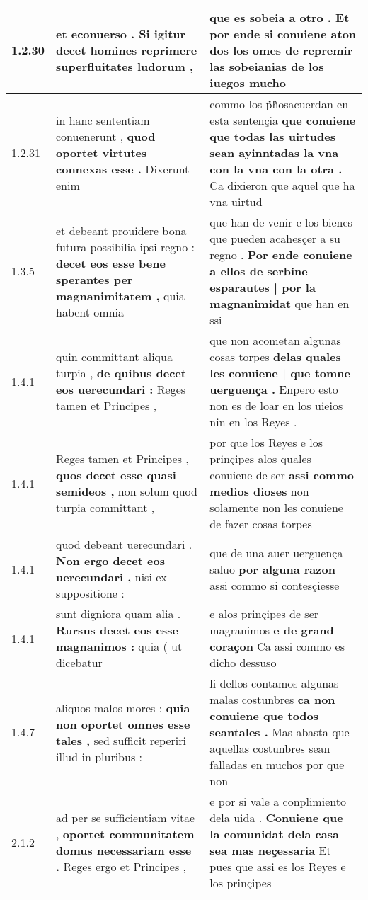\begin{tabular}{|p{1cm}|p{6.5cm}|p{6.5cm}|}
1.2.30 & et econuerso . \textbf{ Si igitur decet homines reprimere } superfluitates ludorum , & que es sobeia a otro . \textbf{ Et por ende si conuiene aton dos los omes } de repremir las sobeianias de los iuegos mucho \\\hline
1.2.31 & in hanc sententiam conuenerunt , \textbf{ quod oportet virtutes connexas esse . } Dixerunt enim & commo los p̃h̃osacuerdan en esta sentençia \textbf{ que conuiene que todas las uirtudes sean ayinntadas la vna con la vna con la otra . } Ca dixieron que aquel que ha vna uirtud \\\hline
1.3.5 & et debeant prouidere bona futura possibilia ipsi regno : \textbf{ decet eos esse bene sperantes per magnanimitatem , } quia habent omnia & que han de venir e los bienes que pueden acahesçer a su regno . \textbf{ Por ende conuiene a ellos de serbine esparautes | por la magnanimidat } que han en ssi \\\hline
1.4.1 & quin committant aliqua turpia , \textbf{ de quibus decet eos uerecundari : } Reges tamen et Principes , & que non acometan algunas cosas torpes \textbf{ delas quales les conuiene | que tomne uerguença . } Enpero esto non es de loar en los uieios nin en los Reyes . \\\hline
1.4.1 & Reges tamen et Principes , \textbf{ quos decet esse quasi semideos , } non solum quod turpia committant , & por que los Reyes e los prinçipes alos quales conuiene de ser \textbf{ assi commo medios dioses } non solamente non les conuiene de fazer cosas torpes \\\hline
1.4.1 & quod debeant uerecundari . \textbf{ Non ergo decet eos uerecundari , } nisi ex suppositione : & que de una auer uerguença saluo \textbf{ por alguna razon } assi commo si contesçiesse \\\hline
1.4.1 & sunt digniora quam alia . \textbf{ Rursus decet eos esse magnanimos : } quia ( ut dicebatur & e alos prinçipes de ser magranimos \textbf{ e de grand coraçon } Ca assi commo es dicho dessuso \\\hline
1.4.7 & aliquos malos mores : \textbf{ quia non oportet omnes esse tales , } sed sufficit reperiri illud in pluribus : & li dellos contamos algunas malas costunbres \textbf{ ca non conuiene que todos seantales . } Mas abasta que aquellas costunbres sean falladas en muchos por que non \\\hline
2.1.2 & ad per se sufficientiam vitae , \textbf{ oportet communitatem domus necessariam esse . } Reges ergo et Principes , & e por si vale a conplimiento dela uida . \textbf{ Conuiene que la comunidat dela casa sea mas neçessaria } Et pues que assi es los Reyes e los prinçipes \\\hline

\end{tabular}
